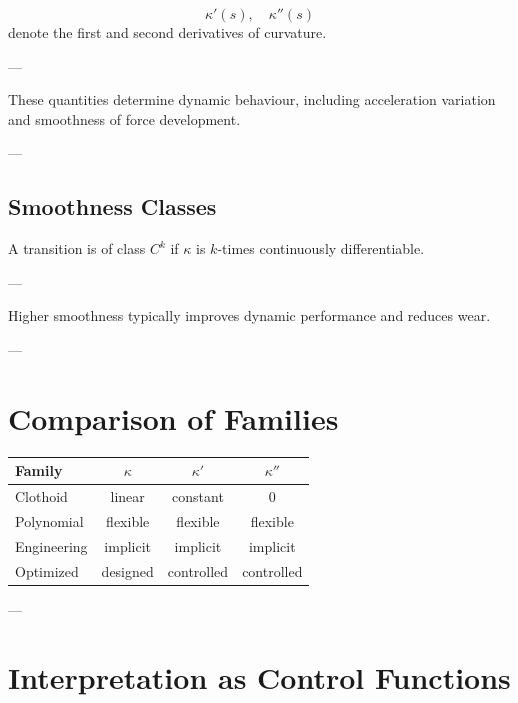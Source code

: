 \begin{definition}
\[
\kappa'(s), \quad \kappa''(s)
\]
denote the first and second derivatives of curvature.
\end{definition}

---

\begin{remark}
These quantities determine dynamic behaviour, including acceleration
variation and smoothness of force development.
\end{remark}

---

\subsection{Smoothness Classes}

\begin{definition}
A transition is of class $C^k$ if $\kappa$ is $k$-times continuously
differentiable.
\end{definition}

---

\begin{remark}
Higher smoothness typically improves dynamic performance and reduces
wear.
\end{remark}

---

\section{Comparison of Families}

\begin{center}
\begin{tabular}{lccc}
\textbf{Family} & $\kappa$ & $\kappa'$ & $\kappa''$ \\
\hline
Clothoid & linear & constant & 0 \\
Polynomial & flexible & flexible & flexible \\
Engineering & implicit & implicit & implicit \\
Optimized & designed & controlled & controlled \\
\end{tabular}
\end{center}

---

\section{Interpretation as Control Functions}

